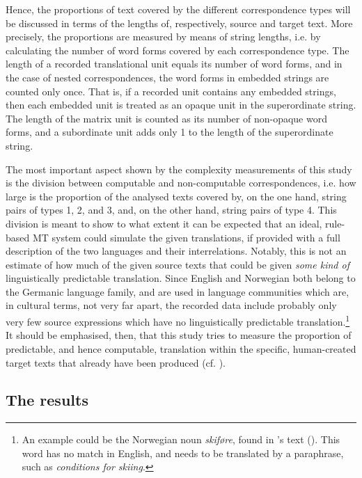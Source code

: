 \documentclass[output=paper]{LSP/langsci}
\begin{document}
Hence, the proportions of text covered by the different correspondence types will be discussed in terms of the lengths of, respectively, source and target text. More precisely, the proportions are measured by means of string lengths, i.e. by calculating the number of word forms covered by each correspondence type. The length of a recorded translational unit equals its number of word forms, and in the case of nested correspondences, the word forms in embedded strings are counted only once. That is, if a recorded unit contains any embedded strings, then each embedded unit is treated as an opaque unit in the superordinate string. The length of the matrix unit is counted as its number of non-opaque word forms, and a subordinate unit adds only 1 to the length of the superordinate string. 

The most important aspect shown by the complexity measurements of this study is the division between computable and non-computable correspondences, i.e. how large is the proportion of the analysed texts covered by, on the one hand, string pairs of types 1, 2, and 3, and, on the other hand, string pairs of type 4. This division is meant to show to what extent it can be expected that an ideal, rule-based MT system could simulate the given translations, if provided with a full description of the two languages and their interrelations. Notably, this is not an estimate of how much of the given source texts that could be given \textit{some kind of} linguistically predictable translation. Since English and Norwegian both belong to the Germanic language family, and are used in language communities which are, in cultural terms, not very far apart, the recorded data include probably only very few source expressions which have no linguistically predictable translation.\footnote{An example could be the Norwegian noun \textit{skiføre}, found in \citeauthor{Vik1979a}'s text (\citeyear{Vik1979a}). This word has no match in English, and needs to be translated by a paraphrase, such as \textit{conditions for skiing}.} It should be emphasised, then, that this study tries to measure the proportion of predictable, and hence computable, translation within the specific, human-created target texts that already have been produced (cf. ).

\subsection{The results}\label{sec:thunes:4.4}
\end{document}
